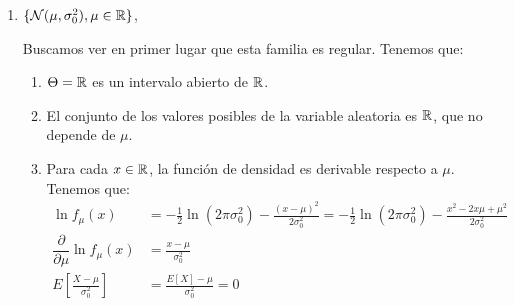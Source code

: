 \begin{ejemplo}
\begin{enumerate}
        Por tanto, definimos:
        \begin{align*}
            T(X_1, \ldots, X_n) &= \sum\limits_{i=1}^n X_i\\
            a(p) &= \frac{1}{p(1-p)}\\
            g(p) &= nk_0p
        \end{align*}

        Hemos de comprobar que $T$ es un estimador de $g(p)$. Tenemos que $T(X_1, \ldots, X_n)$ es siempre positivo, y $g(p) = nk_0p \in \bb{R}^+\ \forall p \in \left]0, 1\right[$. Por tanto, $T$ es un estimador de $g(p)$. Además, tenemos que:
        \begin{align*}
            g'(p) = nk_0 \neq 0\ \forall p \in \left]0, 1\right[
        \end{align*}

        Por último, hemos de comprobar que $I_{X_1, \ldots, X_n}(p) = a(p) g'(p)$. Tenemos que:
        \begin{align*}
            I_{X_1, \ldots, X_n}(p) = n I_X(p) = n \frac{k_0}{p(1-p)} = \frac{1}{p(1-p)} nk_0 = a(p) g'(p)\qquad \forall p \in \left]0, 1\right[
        \end{align*}

        Por tanto, por el Teorema de Caracterización de los estimadores eficientes, $T$ es un estimador eficiente de $g(p) = nk_0p$. Además, por el Corolario de funciones paramétricas que admiten estimadores eficientes, las únicas funciones paramétricas que admiten estimadores eficientes son las de la forma $ag(p) + b = ank_0p + b$, y los correspondientes estimadores eficientes son $aT + b = a\sum\limits_{i=1}^n X_i + b$, con probabilidad 1, bajo todas las distribuciones de la familia.
        
             

        \item $\{\mathcal{N}(\mu, \sigma_0^2), \mu \in \mathbb{R}\}$,
        
        Buscamos ver en primer lugar que esta familia es regular. Tenemos que:
        \begin{enumerate}
            \item $\Theta=\mathbb{R}$ es un intervalo abierto de $\mathbb{R}$.
            \item El conjunto de los valores posibles de la variable aleatoria es $\mathbb{R}$, que no depende de $\mu$.
            \item Para cada $x \in \mathbb{R}$, la función de densidad es derivable respecto a $\mu$. Tenemos que:
            \begin{align*}
                \ln f_\mu(x) &= -\frac{1}{2}\ln(2\pi\sigma_0^2) - \frac{(x-\mu)^2}{2\sigma_0^2} = -\frac{1}{2}\ln(2\pi\sigma_0^2) - \frac{x^2 - 2x\mu + \mu^2}{2\sigma_0^2}\\
                \dfrac{\partial}{\partial\mu}\ln f_\mu(x) &= \frac{x-\mu}{\sigma_0^2}\\
                E\left[\frac{X-\mu}{\sigma_0^2}\right] &= \frac{E[X]-\mu}{\sigma_0^2} = 0
            \end{align*}
        \end{enumerate}


\end{enumerate}
\end{ejemplo}
